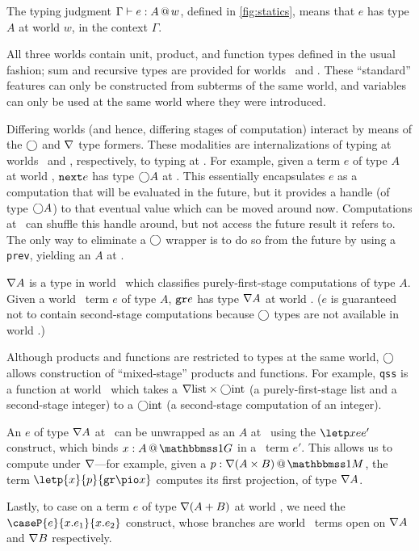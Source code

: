 \begin{abstrsyn}

The typing judgment $\Gamma{} \vdash {e}:{A}~\hspace{-0.15em}\text{@}\hspace{-0.2em}~w$, defined in \ref{fig:statics}, means that
$e$ has type $A$ at world $w$, in the context $\Gamma$. 

All three worlds contain unit, product, and function types defined in the usual fashion;
sum and recursive types are provided for worlds \bbonep\ and \bbtwo.
These ``standard'' features can only be constructed from subterms of the same world,
and variables can only be used at the same world where they were introduced.

Differing worlds (and hence, differing stages of computation) interact by means
of the $\bigcirc$ and $\nabla$ type formers.  These modalities are internalizations
of typing at worlds \bbtwo\ and \bbonep, respectively, to typing at \bbonem.
For example, given a term $e$ of type $A$ at world \bbtwo, 
${\tt next}{e}$ has type $\bigcirc A$ at \bbonem. 
This essentially encapsulates $e$ as a computation that will be evaluated in the future, 
but it provides a handle (of type $\bigcirc A$) to that eventual value which can be moved around now.
Computations at \bbonem\ can shuffle this handle around, but not access the future result it refers to.  
The only way to eliminate a $\bigcirc$ wrapper is to do so from the future by using a {\tt prev}, yielding an $A$ at \bbtwo.

$\nabla A$ is a type in world \bbonem\ which classifies purely-first-stage
computations of type $A$. Given a world \bbonep\ term $e$ of type $A$,
${\tt gr}{e}$ has type $\nabla A$ at world \bbonem. ($e$ is guaranteed not to contain
second-stage computations because $\bigcirc$ types are not available in world
\bbonep.)

Although products and functions are restricted to types at the same world,
$\bigcirc$ allows construction of ``mixed-stage'' products and functions.
For example, \texttt{qss} is a function at world \bbonem\ which takes a
$\nabla{\rm list} \times \bigcirc{\rm int}$ (a purely-first-stage list and a
second-stage integer) to a $\bigcirc{\rm int}$ (a second-stage
computation of an integer).

An $e$ of type $\nabla A$ at \bbonem\ can be unwrapped as an $A$ at \bbonep\
using the $\letp xe{e'}$ construct, which binds $\colpure xA$ in a \bbonem\ term
$e'$. This allows us to compute under $\nabla$---for example, given a $\colmix
p{\curr(A\times B)}$, the term $\letp{x}{p}{\pure{\pio x}}$ computes its first
projection, of type $\nabla A$.

Lastly, to case on a term $e$ of type $\nabla(A+B)$ at world \bbonem, we need the
$\caseP{e}{x.e_1}{x.e_2}$ construct, whose branches are world \bbonem\ terms
open on $\nabla{A}$ and $\nabla{B}$ respectively.


\end{abstrsyn}
